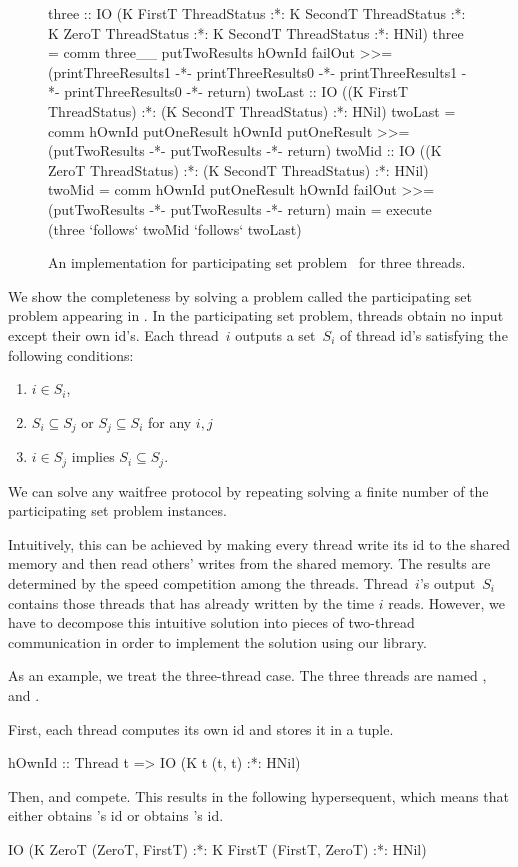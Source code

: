 \begin{figure*}[t]
\begin{spec}
three :: IO (K FirstT ThreadStatus :*: K SecondT ThreadStatus :*:
             K ZeroT  ThreadStatus :*: K SecondT ThreadStatus :*: HNil)
three = comm three__ putTwoResults hOwnId failOut
   >>= (printThreeResults1 -*- printThreeResults0 -*- printThreeResults1
        -*- printThreeResults0 -*- return)
twoLast :: IO ((K FirstT ThreadStatus) :*: (K SecondT ThreadStatus) :*: HNil)
twoLast = comm hOwnId putOneResult hOwnId putOneResult >>=
  (putTwoResults -*- putTwoResults -*- return)
twoMid :: IO ((K ZeroT ThreadStatus) :*: (K SecondT ThreadStatus) :*: HNil)
twoMid = comm hOwnId putOneResult hOwnId failOut >>= (putTwoResults -*- putTwoResults -*- return)
main = execute (three `follows` twoMid `follows` twoLast)
\end{spec}
 \caption{An implementation for participating set problem~\citep{participating} for three
 threads.}
 \label{fig:complete}
\end{figure*}


We show the completeness by solving a problem called
the participating set problem appearing in \citet{participating}.
In the participating set problem, threads obtain no input except their own
id's.
Each thread~$i$ outputs a set~$S_i$ of thread id's satisfying the
following conditions:
\begin{enumerate}
 \item $i\in S_i$,
 \item $S_i\subseteq S_j$ or $S_j\subseteq S_i$ for any $i,j$
 \item $i\in S_j$ implies $S_i\subseteq S_j$.
\end{enumerate}
We can solve any waitfree protocol by repeating solving a finite number
of the participating set problem instances.

Intuitively, this can be achieved by making every thread write its id to
the shared memory and then read others' writes from the shared memory.
The results are determined by the speed competition among the threads.
Thread~$i$'s output~$S_i$ contains those threads that has already
written by the time $i$ reads.
However, we have to decompose this intuitive solution into pieces of
two-thread communication in order to implement the solution using our library.

As an example, we treat the three-thread case.  The three threads are
named \verb@ZeroT@, \verb@FirstT@ and \verb@SecondT@.

First, each thread computes its own id and stores it in a tuple.
\begin{spec}
hOwnId :: Thread t => IO (K t (t, t) :*: HNil)
\end{spec}
Then, \verb@ZeroT@ and \verb@FirstT@ compete.  This results in the
following hypersequent, which means that either \verb@ZeroT@ obtains
\verb@FirstT@'s id or \verb@FirstT@ obtains \verb@ZeroT@'s id.
\begin{spec}
IO (K ZeroT (ZeroT, FirstT) :*: K FirstT (FirstT, ZeroT) :*: HNil)
\end{spec}

